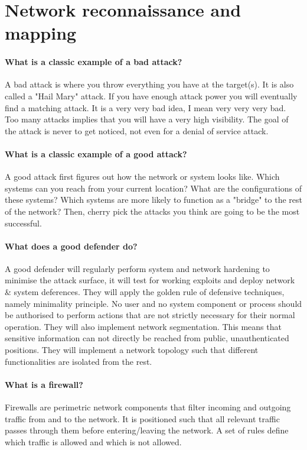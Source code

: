 \section{Network reconnaissance and mapping}
\paragraph{What is a classic example of a bad attack?}
A bad attack is where you throw everything you have at the target(s). It is also called a "Hail Mary" attack. If you have enough attack power you will eventually find a matching attack. It is a very very bad idea, I mean very very very bad. Too many attacks implies that you will have a very high visibility. The goal of the attack is never to get noticed, not even for a denial of service attack.

\paragraph{What is a classic example of a good attack?}
A good attack first figures out how the network or system looks like. Which systems can you reach from your current location? What are the configurations of these systems? Which systems are more likely to function as a "bridge" to the rest of the network? Then, cherry pick the attacks you think are going to be the most successful.

\paragraph{What does a good defender do?}
A good defender will regularly perform system and network hardening to minimise the attack surface, it will test for working exploits and deploy network \& system deferences. They will apply the golden rule of defensive techniques, namely minimality principle. No user and no system component or process should be authorised to perform actions that are not strictly necessary for their normal operation. They will also implement network segmentation. This means that sensitive information can not directly be reached from public, unauthenticated positions. They will implement a network topology such that different functionalities are isolated from the rest.

\paragraph{What is a firewall?}
Firewalls are perimetric network components that filter incoming and outgoing traffic from and to the network. It is positioned such that all relevant traffic passes through them before entering/leaving the network. A set of rules define which traffic is allowed and which is not allowed.

